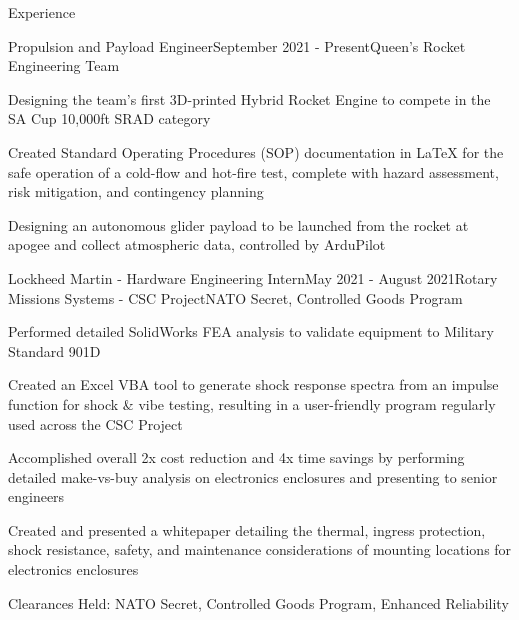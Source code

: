 \documentclass{resume} %
\begin{document}

\begin{rSection}{Experience}

\begin{rSubsection}{Propulsion and Payload Engineer}{September 2021 - Present}{Queen's Rocket Engineering Team}{}
\item Designing the team's first 3D-printed Hybrid Rocket Engine to compete in the SA Cup 10,000ft SRAD category
\item Created Standard Operating Procedures (SOP) documentation in LaTeX for the safe operation of a cold-flow and hot-fire test, complete with hazard assessment, risk mitigation, and contingency planning
\item Designing an autonomous glider payload to be launched from the rocket at apogee and collect atmospheric data, controlled by ArduPilot

\end{rSubsection}

\begin{rSubsection}{Lockheed Martin - Hardware Engineering Intern}{May 2021 - August 2021}{Rotary Missions Systems - CSC Project}{NATO Secret, Controlled Goods Program}

\item Performed detailed SolidWorks FEA analysis to validate equipment to Military Standard 901D
\item Created an Excel VBA tool to generate shock response spectra from an impulse function for shock \& vibe testing, resulting in a user-friendly program regularly used across the CSC Project
\item Accomplished overall 2x cost reduction and 4x time savings by performing detailed make-vs-buy analysis on electronics enclosures and presenting to senior engineers
\item Created and presented a whitepaper detailing the thermal, ingress protection, shock resistance, safety, and maintenance considerations of mounting locations for electronics enclosures
\item Clearances Held: NATO Secret, Controlled Goods Program, Enhanced Reliability

\end{rSubsection}

\begin{comment}


\end{comment}
\end{rSection}
\end{document}
